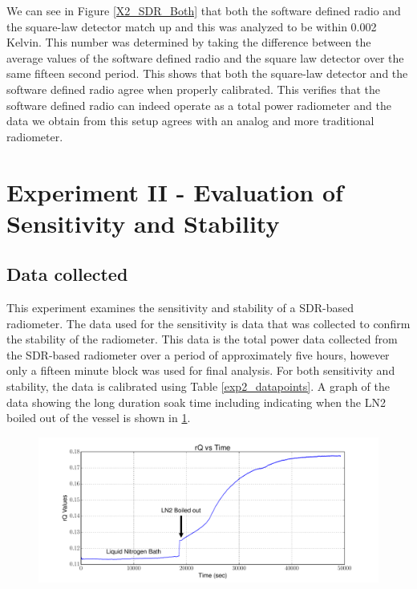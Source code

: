 We can see in Figure \ref{X2_SDR_Both} that both the software defined radio and the square-law detector match up and this was analyzed to be within 0.002 Kelvin.  This number was determined by taking the difference between the average values of the software defined radio and the square law detector over the same fifteen second period.  This shows that both the square-law detector and the software defined radio agree when properly calibrated.  This verifies that the software defined radio can indeed operate as a total power radiometer and the data we obtain from this setup agrees with an analog and more traditional radiometer.

\section{Experiment II - Evaluation of Sensitivity and Stability} \label{Exp2_results}

\subsection{Data collected}
This experiment examines the sensitivity and stability of a SDR-based radiometer.  The data used for the sensitivity is data that was collected to confirm the stability of the radiometer.  This data is the total power data collected from the SDR-based radiometer over a period of approximately five hours, however only a fifteen minute block was used for final analysis.  For both sensitivity and stability, the data is calibrated using Table \ref{exp2_datapoints}.  A graph of the data showing the long duration soak time including indicating when the LN2 boiled out of the vessel is shown in \ref{Stability_graph}.

\begin{figure}[h!tb] \centering
\includegraphics[width=\textwidth]{Experiments/Exp2/sdr_rq_plot.pdf}
\label{Stability_graph}
\end{figure}

